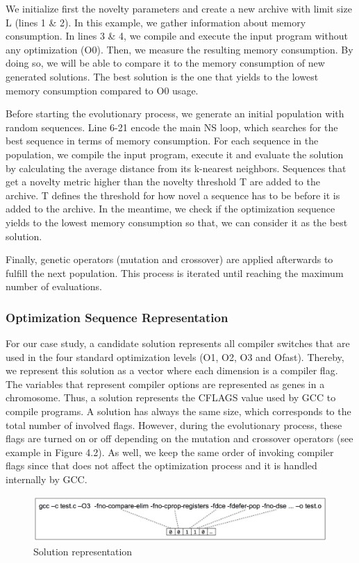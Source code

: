 We initialize first the novelty parameters and create a new archive with limit size L (lines 1 \& 2). In this example, we gather information about memory consumption. In lines 3 \& 4, we compile and execute the input program without any optimization (O0). Then, we measure the resulting memory consumption. By doing so, we will be able to compare it to the memory consumption of new generated solutions. The best solution is the one that yields to the lowest memory consumption compared to O0 usage.

Before starting the evolutionary process, we generate an initial population with random sequences. Line 6-21 encode the main NS loop, which searches for the best sequence in terms of memory consumption. For each sequence in the population, we compile the input program, execute it and evaluate the solution by calculating the average distance from its k-nearest neighbors. Sequences that get a novelty metric higher than the novelty threshold T are added to the archive. T defines the threshold for how novel a sequence has to be before it is added to the archive. In the meantime, we check if the optimization sequence yields to the lowest memory consumption so that, we can consider it as the best solution. 

Finally, genetic operators (mutation and crossover) are applied afterwards to fulfill the next population. This process is iterated until reaching the maximum number of evaluations.


\subsubsection{Optimization Sequence Representation}
For our case study, a candidate solution represents all compiler switches that are used in the four standard optimization levels (O1, O2, O3 and Ofast). Thereby, we represent this solution as a vector where each dimension is a compiler flag. 
The variables that represent compiler options are represented as genes in a chromosome. 
Thus, a solution represents the CFLAGS value used by GCC to compile programs.
A solution has always the same size, which corresponds to the total number of involved flags. 
However, during the evolutionary process, these flags are turned on or off depending on the mutation and crossover operators (see example in Figure 4.2). As well, we keep the same order of invoking compiler flags since that does not affect the optimization process and it is handled internally by GCC.

\begin{figure}[h]
	\centering
	\includegraphics[width=1\hsize]{chapitre3/fig/individual.png}
	\caption{Solution representation}	
\end{figure}

